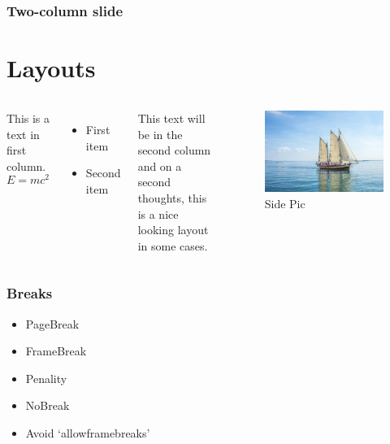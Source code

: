 \documentclass[12pt,[aspectratio=169]{beamer}
\begin{document}
\begin{frame}
    \frametitle{Two-column slide}
    \section{Layouts}
    \begin{columns}
        This is a text in first column.
        $$E=mc^2$$
        \begin{itemize}
        \item First item
        \item Second item
        \end{itemize}
        
        This text will be in the second column
        and on a second thoughts, this is a nice looking
        layout in some cases.
        \begin{figure}
            \centering
            \includegraphics[width=0.8\linewidth]{boat.jpg}
            \caption{Side Pic}
            \label{fig:boat}
        \end{figure}
    \end{columns}
\end{frame}

\begin{frame}
    \frametitle{Breaks}
    \begin{itemize}
        \item PageBreak
        \item FrameBreak
        \break
        \item Penality
        \item NoBreak
        \nobreak
        \item Avoid `allowframebreaks'
    \end{itemize}

\end{frame}
\end{document}

